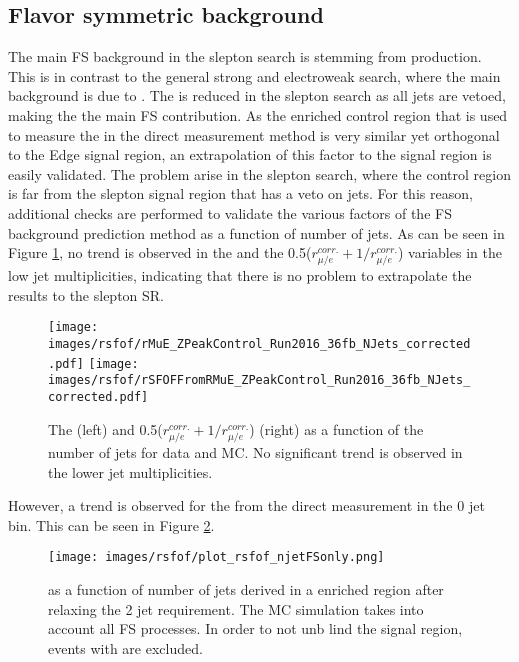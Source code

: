 \subsection*{Flavor symmetric background}
\noindent\justify
The main FS background in the slepton search is stemming from \PWW production.
This is in contrast to the general strong and electroweak search, where the main background is due to \ttbar.
The \ttbar is reduced in the slepton search as all jets are vetoed, making the \PWW the main FS contribution.
As the \ttbar enriched control region that is used to measure the \Rsfof in the direct measurement method is very similar yet orthogonal to the Edge signal region, an extrapolation of this factor to     the signal region is easily validated.
The problem arise in the slepton search, where the \ttbar control region is far from the slepton signal region that has a veto on jets.
For this reason, additional checks are performed to validate the various factors of the FS background prediction method as a function of number of jets.
As can be seen in Figure \ref{fig:rmueSlepton}, no trend is observed in the \rmue and the 0.5($r_{\mu/e}^{corr.}+1/r_{\mu/e}^{corr.}$) variables in the low jet multiplicities, indicating that there is     no problem to extrapolate the results to the slepton SR.
\begin{figure}[htbp!]
\begin{center}
    \texttt{[image: images/rsfof/rMuE\_ZPeakControl\_Run2016\_36fb\_NJets\_corrected.pdf]}
    \texttt{[image: images/rsfof/rSFOFFromRMuE\_ZPeakControl\_Run2016\_36fb\_NJets\_corrected.pdf]}
    \caption{The \rmue (left) and 0.5($r_{\mu/e}^{corr.}+1/r_{\mu/e}^{corr.}$) (right) as a function of the number of jets for data and MC. No significant trend is observed in the lower jet multiplicities.}
\label{fig:rmueSlepton}
\end{center}
\end{figure}
\newpara
\noindent\justify
However, a trend is observed for the \Rsfof from the direct measurement in the 0 jet bin. This can be seen in Figure \ref{fig:rsfofSleptonOne}.
\begin{figure}[htbp!]
\begin{center}
    \texttt{[image: images/rsfof/plot\_rsfof\_njetFSonly.png]}
    \caption{\Rsfof as a function of number of jets derived in a \ttbar enriched region after relaxing the 2 jet requirement. The MC simulation takes into account all FS processes. In order to not unb    lind the signal region, events with are excluded.}
\label{fig:rsfofSleptonOne}
\end{center}
\end{figure} 
